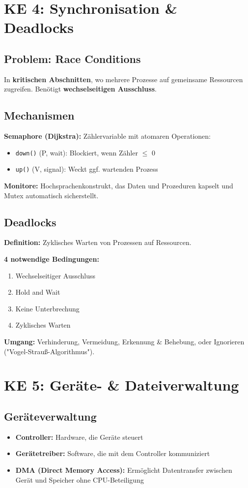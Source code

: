 \documentclass[9pt,a4paper]{extarticle}
\begin{document}
\begin{multicols*}{2}
\section{KE 4: Synchronisation \& Deadlocks}

\subsection{Problem: Race Conditions}
In \textbf{kritischen Abschnitten}, wo mehrere Prozesse auf gemeinsame Ressourcen zugreifen. Benötigt \textbf{wechselseitigen Ausschluss}.

\subsection{Mechanismen}
\textbf{Semaphore (Dijkstra):} Zählervariable mit atomaren Operationen:
\begin{itemize}
\item \texttt{down()} (P, wait): Blockiert, wenn Zähler $\leq$ 0
\item \texttt{up()} (V, signal): Weckt ggf. wartenden Prozess
\end{itemize}

\textbf{Monitore:} Hochsprachenkonstrukt, das Daten und Prozeduren kapselt und Mutex automatisch sicherstellt.

\subsection{Deadlocks}
\textbf{Definition:} Zyklisches Warten von Prozessen auf Ressourcen.

\textbf{4 notwendige Bedingungen:}
\begin{enumerate}
\item Wechselseitiger Ausschluss
\item Hold and Wait
\item Keine Unterbrechung
\item Zyklisches Warten
\end{enumerate}

\textbf{Umgang:} Verhinderung, Vermeidung, Erkennung \& Behebung, oder Ignorieren ("Vogel-Strauß-Algorithmus").

\section{KE 5: Geräte- \& Dateiverwaltung}

\subsection{Geräteverwaltung}
\begin{itemize}
\item \textbf{Controller:} Hardware, die Geräte steuert
\item \textbf{Gerätetreiber:} Software, die mit dem Controller kommuniziert
\item \textbf{DMA (Direct Memory Access):} Ermöglicht Datentransfer zwischen Gerät und Speicher ohne CPU-Beteiligung
\end{itemize}


\end{multicols*}
\end{document}
